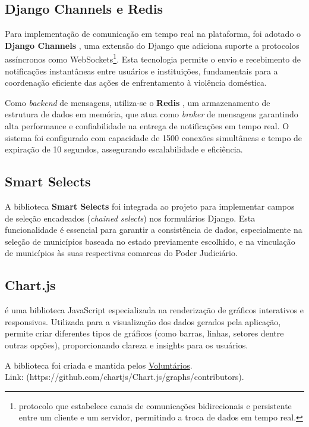 \subsection{Django Channels e Redis}\label{sec:channels_redis}
\par Para implementação de comunicação em tempo real na plataforma, foi adotado o \textbf{Django Channels} \cite{django_channels:2025}, uma extensão do Django que adiciona suporte a protocolos assíncronos como WebSockets\footnote{protocolo que estabelece canais de comunicações bidirecionais e persistente entre um cliente e um servidor, permitindo a troca de dados em tempo real.}. Esta tecnologia permite o envio e recebimento de notificações instantâneas entre usuários e instituições, fundamentais para a coordenação eficiente das ações de enfrentamento à violência doméstica.
\par Como \textit{backend} de mensagens, utiliza-se o \textbf{Redis} \cite{redis:2025}, um armazenamento de estrutura de dados em memória, que atua como \textit{broker} de mensagens garantindo alta performance e confiabilidade na entrega de notificações em tempo real. O sistema foi configurado com capacidade de 1500 conexões simultâneas e tempo de expiração de 10 segundos, assegurando escalabilidade e eficiência.

\subsection{Smart Selects}
\par A biblioteca \textbf{Smart Selects} \cite{smart_selects:2025} foi integrada ao projeto para implementar campos de seleção encadeados (\textit{chained selects}) nos formulários Django. Esta funcionalidade é essencial para garantir a consistência de dados, especialmente na seleção de municípios baseada no estado previamente escolhido, e na vinculação de municípios às suas respectivas comarcas do Poder Judiciário.

\subsection{Chart.js}
\par {} é uma biblioteca JavaScript especializada na renderização de gráficos interativos e responsivos. Utilizada para a visualização dos dados gerados pela aplicação, permite criar diferentes tipos de gráficos (como barras, linhas, setores dentre outras opções), proporcionando clareza e insights para os usuários.
\par A biblioteca foi criada e mantida pelos \href{https://github.com/chartjs/Chart.js/graphs/contributors}{Voluntários}. \\
Link: (https://github.com/chartjs/Chart.js/graphs/contributors).


